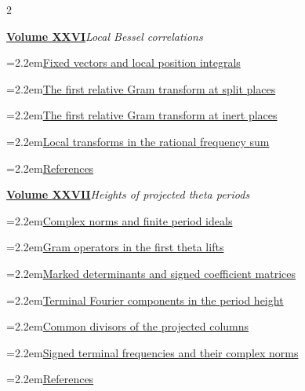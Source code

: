 \documentclass[a4paper,11pt]{article}
\theoremstyle{definition}
\theoremstyle{remark}
\numberwithin{equation}{section}
\begin{document}
\begin{multicols}{2}
\begin{minipage}{\linewidth}
\end{minipage}\par\medskip
\noindent\begin{minipage}{\linewidth}\raggedright
\textbf{\hyperref[nav:volume-XXVI]{Volume XXVI}}\enspace\emph{Local Bessel correlations}\par\smallskip
\noindent\hangindent=2.2em\hyperref[nav:marked-orbital-energy]{Fixed vectors and local position integrals}\par
\noindent\hangindent=2.2em\hyperref[nav:split-gram-transforms]{The first relative Gram transform at split places}\par
\noindent\hangindent=2.2em\hyperref[nav:inert-gram-transforms]{The first relative Gram transform at inert places}\par
\noindent\hangindent=2.2em\hyperref[nav:local-rational-frequency-sum]{Local transforms in the rational frequency sum}\par
\noindent\hangindent=2.2em\hyperref[nav:bibliography-XXVI]{References}\par
\end{minipage}\par\medskip
\noindent\begin{minipage}{\linewidth}\raggedright
\textbf{\hyperref[nav:volume-XXVII]{Volume XXVII}}\enspace\emph{Heights of projected theta periods}\par\smallskip
\noindent\hangindent=2.2em\hyperref[nav:chapter-norms-and-period-ideals]{Complex norms and finite period ideals}\par
\noindent\hangindent=2.2em\hyperref[nav:theta-gram]{Gram operators in the first theta lifts}\par
\noindent\hangindent=2.2em\hyperref[nav:chapter-marked-period-determinants]{Marked determinants and signed coefficient matrices}\par
\noindent\hangindent=2.2em\hyperref[nav:chapter-terminal-fourier-heights]{Terminal Fourier components in the period height}\par
\noindent\hangindent=2.2em\hyperref[nav:chapter-projected-period-divisors]{Common divisors of the projected columns}\par
\noindent\hangindent=2.2em\hyperref[nav:chapter-signed-terminal-frequencies]{Signed terminal frequencies and their complex norms}\par
\noindent\hangindent=2.2em\hyperref[nav:bibliography-XXVII]{References}\par
\end{minipage}\par\medskip
\end{multicols}\endgroup\clearpage
\begingroup\small\setlength{\parskip}{0pt}\tableofcontents\endgroup
\clearpage
\end{document}
